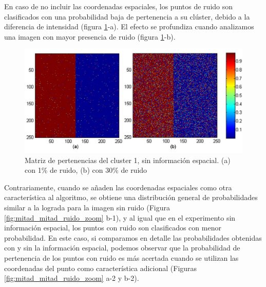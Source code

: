 En caso de no incluir las coordenadas espaciales, los puntos de ruido son clasificados con una probabilidad baja de pertenencia a su clúster, debido a la diferencia de intensidad (figura \ref{fig:ruido_1y30}-a). El efecto se profundiza cuando analizamos una imagen con mayor presencia de ruido (figura \ref{fig:ruido_1y30}-b).


\begin{figure}[h]
\centering
\includegraphics[scale=0.055]{images/mitad_mitad__ruido_1y_30.jpg}
\caption{Matriz de pertenencias del cluster 1, sin información espacial. (a) con 1\% de ruido, (b) con 30\% de ruido
}
\label{fig:ruido_1y30}
\end{figure}

Contrariamente, cuando se añaden las coordenadas espaciales como otra característica al algoritmo, se obtiene una distribución general de probabilidades similar a la lograda para la imagen sin ruido (Figura \ref{fig:mitad_mitad_ruido_zoom} b-1), y al igual que en el experimento sin información espacial, los puntos con ruido son clasificados con menor probabilidad. 
En este caso, si comparamos en detalle las probabilidades obtenidas con y sin la información espacial, podemos observar que la probabilidad de pertenencia de los  puntos con ruido es más acertada cuando se utilizan las coordenadas del punto como característica adicional (Figuras \ref{fig:mitad_mitad_ruido_zoom} a-2 y b-2).


